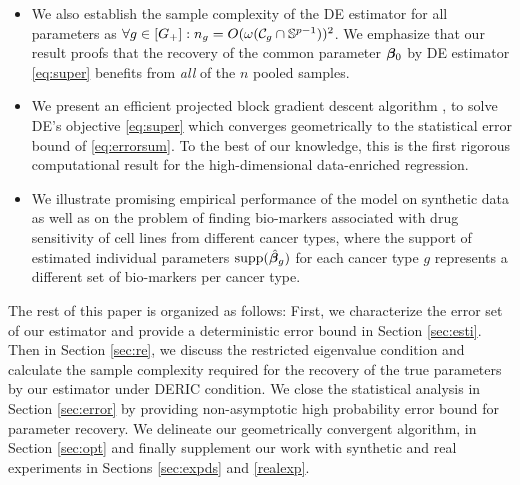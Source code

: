 \begin{itemize}[leftmargin = .4cm]
	\item We also establish the sample complexity of the DE estimator for all parameters as $\forall g \in [G_+]: n_g = O(\omega(\cC_g \cap \sphere))^2$. We emphasize that our result proofs that the recovery of the common parameter $\boldsymbol{\beta}_0$ by DE estimator \eqref{eq:super} benefits from \emph{all} of the $n$ pooled samples.
	\item We present an efficient projected block gradient descent algorithm \emph{\dc}, to solve DE's objective \eqref{eq:super} which converges geometrically to the statistical error bound of \eqref{eq:errorsum}. To the best of our knowledge, this is the first rigorous computational result for the high-dimensional data-enriched regression.
	\item We illustrate promising empirical performance of the model on synthetic data as well as on the problem of finding bio-markers associated with drug sensitivity of cell lines from different cancer types, where the support of estimated individual parameters $\text{supp}(\hat{\boldsymbol{\beta}}_g)$ for each cancer type $g$ represents a different set of bio-markers per cancer type.
\end{itemize}

The rest of this paper is organized as follows:
First, we characterize the error set of our estimator and provide a deterministic error bound in Section \ref{sec:esti}.
Then in Section \ref{sec:re}, we discuss the restricted eigenvalue condition and calculate the sample complexity required for the recovery of the true parameters by our estimator under DERIC condition.
We close the statistical analysis in Section \ref{sec:error} by providing non-asymptotic high probability error bound for parameter recovery.
We delineate our geometrically convergent algorithm, \dc{} in Section \ref{sec:opt} and finally supplement our work with synthetic and real experiments in Sections \ref{sec:expds} and \ref{realexp}.

